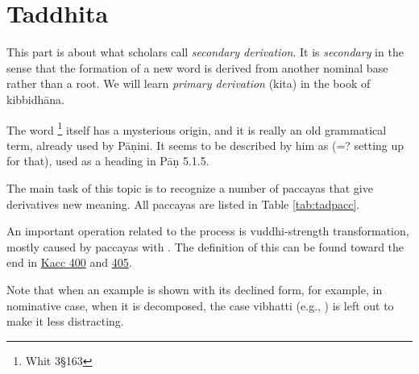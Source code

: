 \chapter{Taddhita}

This part is about what scholars call \emph{secondary derivation}. It is \emph{secondary} in the sense that the formation of a new word is derived from another nominal base rather than a root. We will learn \emph{primary derivation} (kita) in the book of kibbidhāna.

The word \footnote{Whit 3\S163} itself has a mysterious origin, and it is really an old grammatical term, already used by Pāṇini. It seems to be described by him as  (=? setting up for that), used as a heading in Pāṇ 5.1.5.

The main task of this topic is to recognize a number of paccayas that give derivatives new meaning. All paccayas are listed in Table \ref{tab:tadpacc}.

An important operation related to the process is vuddhi-strength transformation, mostly caused by paccayas with . The definition of this can be found toward the end in \hyperref[sut:400]{Kacc 400} and \hyperref[sut:405]{405}.

Note that when an example is shown with its declined form, for example, in nominative case, when it is decomposed, the case vibhatti (e.g., ) is left out to make it less distracting.

